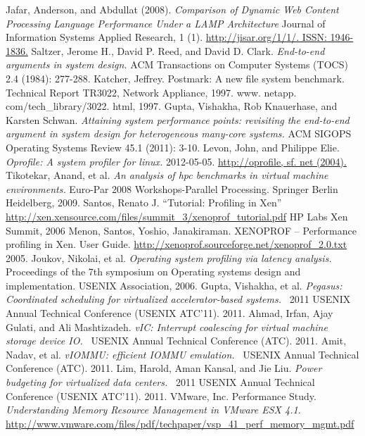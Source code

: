 \begin{thebibliography}{9}
Jafar, Anderson, and Abdullat (2008). \emph{Comparison of Dynamic Web Content Processing Language Performance Under a LAMP Architecture}  Journal of Information Systems Applied Research, 1 (1). \url{http://jisar.org/1/1/. ISSN: 1946-1836.}
Saltzer, Jerome H., David P. Reed, and David D. Clark.  \emph{End-to-end arguments in system design.}  ACM Transactions on Computer Systems (TOCS) 2.4 (1984): 277-288.
Katcher, Jeffrey. Postmark: A new file system benchmark. Technical Report TR3022, Network Appliance, 1997. www. netapp. com/tech\_library/3022. html, 1997.
Gupta, Vishakha, Rob Knauerhase, and Karsten Schwan.  \emph{Attaining system performance points: revisiting the end-to-end argument in system design for heterogeneous many-core systems.}  ACM SIGOPS Operating Systems Review 45.1 (2011): 3-10.
Levon, John, and Philippe Elie.  \emph{Oprofile: A system profiler for linux.}  2012-05-05. \url{http://oprofile, sf. net (2004).}
Tikotekar, Anand, et al.  \emph{An analysis of hpc benchmarks in virtual machine environments.}  Euro-Par 2008 Workshops-Parallel Processing. Springer Berlin Heidelberg, 2009.
Santos, Renato J.  “Tutorial:  Profiling in Xen” \url{http://xen.xensource.com/files/summit\_3/xenoprof\_tutorial.pdf}  HP Labs  Xen Summit, 2006
Menon, Santos, Yoshio, Janakiraman.  XENOPROF – Performance profiling in Xen.  User Guide.   \url{http://xenoprof.sourceforge.net/xenoprof\_2.0.txt}  2005.
Joukov, Nikolai, et al.  \emph{Operating system profiling via latency analysis.}  Proceedings of the 7th symposium on Operating systems design and implementation. USENIX Association, 2006.
Gupta, Vishakha, et al.  \emph{Pegasus: Coordinated scheduling for virtualized accelerator-based systems.}  2011 USENIX Annual Technical Conference (USENIX ATC’11). 2011.
Ahmad, Irfan, Ajay Gulati, and Ali Mashtizadeh.  \emph{vIC: Interrupt coalescing for virtual machine storage device IO.}  USENIX Annual Technical Conference (ATC). 2011.
Amit, Nadav, et al.  \emph{vIOMMU: efficient IOMMU emulation.}  USENIX Annual Technical Conference (ATC). 2011.
Lim, Harold, Aman Kansal, and Jie Liu.  \emph{Power budgeting for virtualized data centers.}  2011 USENIX Annual Technical Conference (USENIX ATC’11). 2011.
VMware, Inc.  Performance Study.  \emph{Understanding Memory Resource Management in VMware ESX 4.1.} \url{http://www.vmware.com/files/pdf/techpaper/vsp\_41\_perf\_memory\_mgmt.pdf}

\end{thebibliography}
